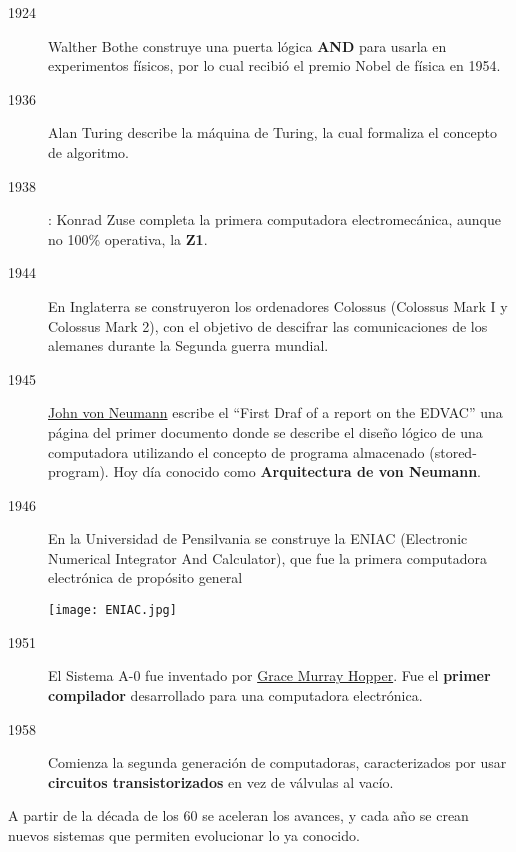 \begin{description}
    \item[1924] Walther Bothe construye una puerta lógica \textbf{AND} para usarla en experimentos físicos, por lo cual recibió el premio Nobel de física en 1954.

    \item[1936] Alan Turing describe la máquina de Turing, la cual formaliza el concepto de algoritmo.

    \item[1938]: Konrad Zuse completa la primera computadora electromecánica, aunque no 100\% operativa, la \textbf{Z1}.

    \item[1944] En Inglaterra se construyeron los ordenadores Colossus (Colossus Mark I y Colossus Mark 2), con el objetivo de descifrar las comunicaciones de los alemanes durante la Segunda guerra mundial.

    \item[1945] \href{https://es.wikipedia.org/wiki/John_von_Neumann}{John von Neumann} escribe el “First Draf of a report on the EDVAC” una página del primer documento donde se describe el diseño lógico de una computadora utilizando el concepto de programa almacenado (stored-program). Hoy día conocido como \textbf{Arquitectura de von Neumann}.

    \item[1946] En la Universidad de Pensilvania se construye la ENIAC (Electronic Numerical Integrator And Calculator), que fue la primera computadora electrónica de propósito general

    \begin{center}
        \texttt{[image: ENIAC.jpg]}
    \end{center}

    \item[1951] El Sistema A-0 fue inventado por \href{https://es.wikipedia.org/wiki/Grace_Murray_Hopper}{Grace Murray Hopper}. Fue el \textbf{primer compilador} desarrollado para una computadora electrónica.

    \item[1958] Comienza la segunda generación de computadoras, caracterizados por usar \textbf{circuitos transistorizados} en vez de válvulas al vacío.

\end{description}

A partir de la década de los 60 se aceleran los avances, y cada año se crean nuevos sistemas que permiten evolucionar lo ya conocido.

